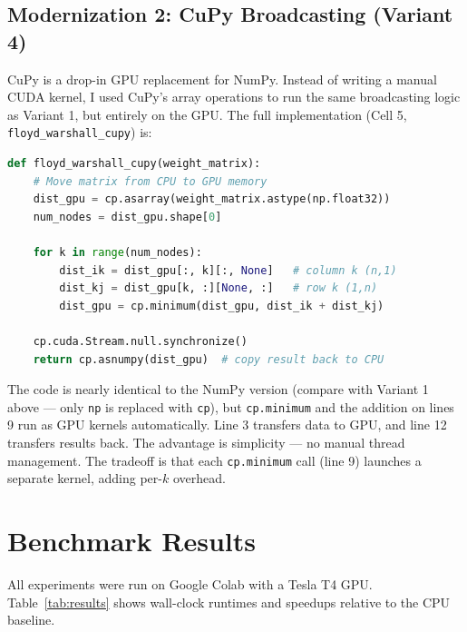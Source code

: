 \documentclass[11pt]{article}
\begin{document}
\subsection{Modernization 2: CuPy Broadcasting (Variant 4)}

CuPy is a drop-in GPU replacement for NumPy. Instead of writing a manual CUDA kernel, I used CuPy's array operations to run the same broadcasting logic as Variant 1, but entirely on the GPU. The full implementation (Cell 5, \texttt{floyd\_warshall\_cupy}) is:

\begin{lstlisting}[language=Python]
def floyd_warshall_cupy(weight_matrix):
    # Move matrix from CPU to GPU memory
    dist_gpu = cp.asarray(weight_matrix.astype(np.float32))
    num_nodes = dist_gpu.shape[0]

    for k in range(num_nodes):
        dist_ik = dist_gpu[:, k][:, None]   # column k (n,1)
        dist_kj = dist_gpu[k, :][None, :]   # row k (1,n)
        dist_gpu = cp.minimum(dist_gpu, dist_ik + dist_kj)

    cp.cuda.Stream.null.synchronize()
    return cp.asnumpy(dist_gpu)  # copy result back to CPU
\end{lstlisting}

The code is nearly identical to the NumPy version (compare with Variant 1 above --- only \texttt{np} is replaced with \texttt{cp}), but \texttt{cp.minimum} and the addition on lines 9 run as GPU kernels automatically. Line 3 transfers data to GPU, and line 12 transfers results back. The advantage is simplicity --- no manual thread management. The tradeoff is that each \texttt{cp.minimum} call (line 9) launches a separate kernel, adding per-$k$ overhead.

\section{Benchmark Results}

All experiments were run on Google Colab with a Tesla T4 GPU. Table~\ref{tab:results} shows wall-clock runtimes and speedups relative to the CPU baseline.
\end{document}
